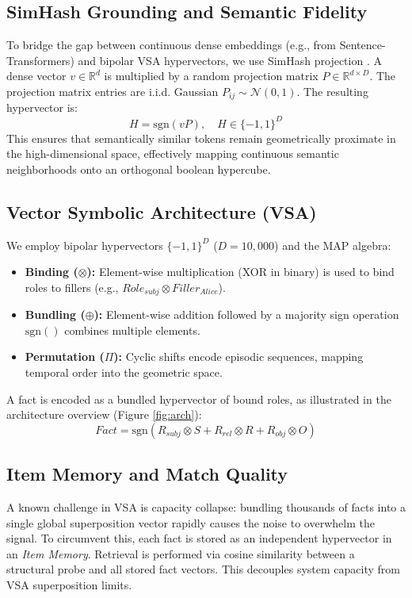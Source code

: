 \documentclass[11pt,letterpaper]{article}
\begin{document}
\subsection{SimHash Grounding and Semantic Fidelity}
To bridge the gap between continuous dense embeddings (e.g., from Sentence-Transformers) and bipolar VSA hypervectors, we use SimHash projection \cite{charikar2002similarity}. A dense vector $v \in \mathbb{R}^d$ is multiplied by a random projection matrix $P \in \mathbb{R}^{d \times D}$. The projection matrix entries are i.i.d. Gaussian $P_{ij} \sim \mathcal{N}(0,1)$. The resulting hypervector is:
\begin{equation}
    H = \mathrm{sgn}(v P), \quad H \in \{-1, 1\}^D
\end{equation}
This ensures that semantically similar tokens remain geometrically proximate in the high-dimensional space, effectively mapping continuous semantic neighborhoods onto an orthogonal boolean hypercube.

\subsection{Vector Symbolic Architecture (VSA)}
We employ bipolar hypervectors $\{-1, 1\}^D$ ($D=10,000$) and the MAP algebra:
\begin{itemize}
    \item \textbf{Binding ($\otimes$):} Element-wise multiplication (XOR in binary) is used to bind roles to fillers (e.g., $Role_{subj} \otimes Filler_{Alice}$).
    \item \textbf{Bundling ($\oplus$):} Element-wise addition followed by a majority sign operation $\text{sgn}()$ combines multiple elements.
    \item \textbf{Permutation ($\Pi$):} Cyclic shifts encode episodic sequences, mapping temporal order into the geometric space.
\end{itemize}

A fact is encoded as a bundled hypervector of bound roles, as illustrated in the architecture overview (Figure \ref{fig:arch}):
\begin{equation}
    Fact = \mathrm{sgn}(R_{subj} \otimes S + R_{rel} \otimes R + R_{obj} \otimes O)
\end{equation}

\subsection{Item Memory and Match Quality}
A known challenge in VSA is capacity collapse: bundling thousands of facts into a single global superposition vector rapidly causes the noise to overwhelm the signal. To circumvent this, each fact is stored as an independent hypervector in an \textit{Item Memory}. Retrieval is performed via cosine similarity between a structural probe and all stored fact vectors. This decouples system capacity from VSA superposition limits.
\end{document}
